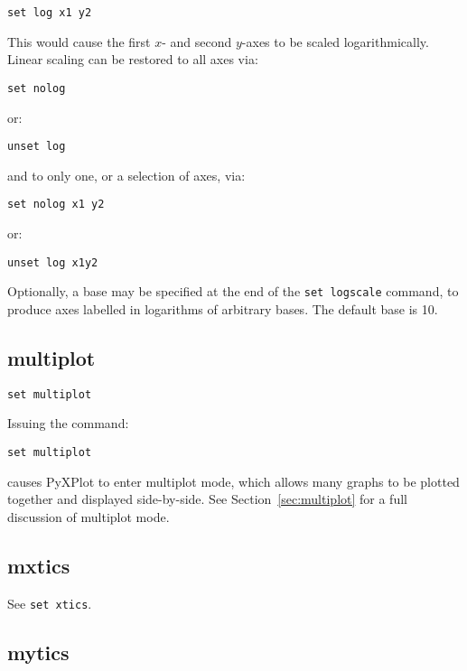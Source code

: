 \begin{verbatim}
set log x1 y2
\end{verbatim}

This would cause the first $x$- and second $y$-axes to be scaled logarithmically.
Linear scaling can be restored to all axes via:

\begin{verbatim}
set nolog
\end{verbatim}

\noindent or:

\begin{verbatim}
unset log
\end{verbatim}

\noindent and to only one, or a selection of axes, via:

\begin{verbatim}
set nolog x1 y2
\end{verbatim}

\noindent or:

\begin{verbatim}
unset log x1y2
\end{verbatim}

Optionally, a base may be specified at the end of the {\tt set logscale}
command, to produce axes labelled in logarithms of arbitrary bases.  The default
base is 10.

\subsection{multiplot}

\begin{verbatim}
set multiplot
\end{verbatim}

Issuing the command:

\begin{verbatim}
set multiplot
\end{verbatim}

\noindent causes PyXPlot to enter multiplot mode, which allows many graphs to
be plotted together and displayed side-by-side. See Section~\ref{sec:multiplot}
for a full discussion of multiplot mode.

\subsection{mxtics}

See {\tt set xtics}.

\subsection{mytics}

